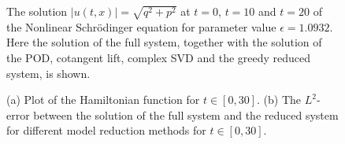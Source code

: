 \begin{figure}
\caption{The solution $|u(t,x)| = \sqrt{q^2 + p^2}$ at $t=0$, $t=10$ and $t=20$ of the Nonlinear Schr\"odinger equation for parameter value $\epsilon = 1.0932$. Here the solution of the full system, together with the solution of the POD, cotangent lift, complex SVD and the greedy reduced system, is shown.}
\label{fig:NuRe:3}
\end{figure}

\begin{figure}

\begin{minipage}{.5\linewidth}
\centering
{}
\end{minipage}%
\begin{minipage}{.5\linewidth}
\centering
{}
\end{minipage}\par\medskip
\centering

\caption{ (a) Plot of the Hamiltonian function for $t \in [0,30]$. (b) The $L^2$-error between the solution of the full system and the reduced system for different model reduction methods for $t \in [0,30]$. }
\label{fig:NuRe:4}
\end{figure}


